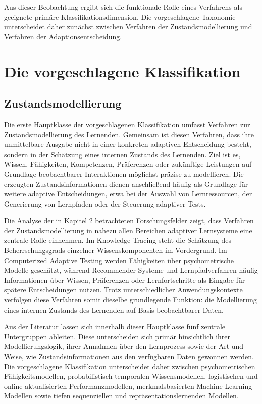 Aus dieser Beobachtung ergibt sich die funktionale Rolle eines
Verfahrens als geeignete primäre Klassifikationsdimension. Die
vorgeschlagene Taxonomie unterscheidet daher zunächst zwischen Verfahren
der Zustandsmodellierung und Verfahren der Adaptionsentscheidung.

\section{Die vorgeschlagene
Klassifikation}\label{die-vorgeschlagene-klassifikation}

\subsection{Zustandsmodellierung}\label{zustandsmodellierung}

Die erste Hauptklasse der vorgeschlagenen Klassifikation umfasst
Verfahren zur Zustandsmodellierung des Lernenden. Gemeinsam ist diesen
Verfahren, dass ihre unmittelbare Ausgabe nicht in einer konkreten
adaptiven Entscheidung besteht, sondern in der Schätzung eines internen
Zustands des Lernenden. Ziel ist es, Wissen, Fähigkeiten, Kompetenzen,
Präferenzen oder zukünftige Leistungen auf Grundlage beobachtbarer
Interaktionen möglichst präzise zu modellieren. Die erzeugten
Zustandsinformationen dienen anschließend häufig als Grundlage für
weitere adaptive Entscheidungen, etwa bei der Auswahl von
Lernressourcen, der Generierung von Lernpfaden oder der Steuerung
adaptiver Tests.

Die Analyse der in Kapitel 2 betrachteten Forschungsfelder zeigt, dass
Verfahren der Zustandsmodellierung in nahezu allen Bereichen adaptiver
Lernsysteme eine zentrale Rolle einnehmen. Im Knowledge Tracing steht
die Schätzung des Beherrschungsgrads einzelner Wissenskomponenten im
Vordergrund. Im Computerized Adaptive Testing werden Fähigkeiten über
psychometrische Modelle geschätzt, während Recommender-Systeme und
Lernpfadverfahren häufig Informationen über Wissen, Präferenzen oder
Lernfortschritte als Eingabe für spätere Entscheidungen nutzen. Trotz
unterschiedlicher Anwendungskontexte verfolgen diese Verfahren somit
dieselbe grundlegende Funktion: die Modellierung eines internen Zustands
des Lernenden auf Basis beobachtbarer Daten.

Aus der Literatur lassen sich innerhalb dieser Hauptklasse fünf zentrale
Untergruppen ableiten. Diese unterscheiden sich primär hinsichtlich
ihrer Modellierungslogik, ihrer Annahmen über den Lernprozess sowie der
Art und Weise, wie Zustandsinformationen aus den verfügbaren Daten
gewonnen werden. Die vorgeschlagene Klassifikation unterscheidet daher
zwischen psychometrischen Fähigkeitsmodellen, probabilistisch-temporalen
Wissensmodellen, logistischen und online aktualisierten
Performanzmodellen, merkmalsbasierten Machine-Learning-Modellen sowie
tiefen sequenziellen und repräsentationslernenden Modellen.

